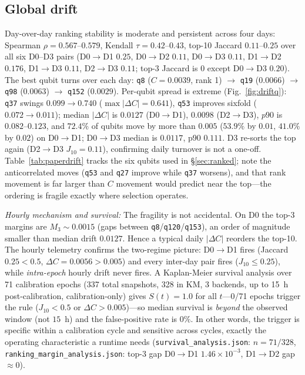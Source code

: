 \documentclass[journal,10pt,twocolumn]{IEEEtran}
\newcommand{\q}[1]{\texttt{q#1}}
\begin{document}
\subsection{Global drift}
\label{sec:driftglob}
Day-over-day ranking stability is moderate and persistent across four days: Spearman $\rho{=}0.567$--$0.579$,
Kendall $\tau{=}0.42$--$0.43$, top-10 Jaccard $0.11$--$0.25$ over all six D0--D3 pairs
(D0$\to$D1 $0.25$, D0$\to$D2 $0.11$, D0$\to$D3 $0.11$, D1$\to$D2 $0.176$, D1$\to$D3 $0.11$, D2$\to$D3 $0.11$; top-3 Jaccard is $0$ except D0$\to$D3 $0.20$).
The best qubit turns over each day:
\q{8} ($C{=}0.0039$, rank 1) $\to$ \q{19} ($0.0066$) $\to$ \q{98} ($0.0063$) $\to$ \q{152} ($0.0029$).
Per-qubit spread is extreme (Fig.~\ref{fig:driftq}): \q{37} swings $0.099{\to}0.740$ ($\max|\Delta C|{=}0.641$), \q{53} improves sixfold
($0.072{\to}0.011$); median $|\Delta C|$ is $0.0127$ (D0$\to$D1), $0.0098$ (D2$\to$D3), $p90$ is $0.082$--$0.123$, and $72.4\%$ of qubits move by more than
$0.005$ ($53.9\%$ by $0.01$, $41.0\%$ by $0.02$) on D0$\to$D1; D0$\to$D3 median is $0.0117$, p90 $0.111$. D3 re-sorts the top again (D2$\to$D3 $J_{10}{=}0.11$),
confirming daily turnover is not a one-off. Table~\ref{tab:paperdrift}
tracks the six qubits used in \S\ref{sec:ranked}; note the anticorrelated moves (\q{53} and \q{27} improve while
\q{37} worsens), and that rank movement is far larger than $C$ movement would predict near the top---the ordering
is fragile exactly where selection operates.

\emph{Hourly mechanism and survival:} The fragility is not accidental. On D0 the top-3 margins are $M_3\sim0.0015$ (gaps
between \q{8}/\q{120}/\q{153}), an order of magnitude smaller than median drift $0.0127$. Hence a typical daily
$|\Delta C|$ reorders the top-10. The hourly telemetry confirms the two-regime picture: D0$\to$D1 fires (Jaccard $0.25<0.5$, $\Delta C{=}0.0056>0.005$)
and every inter-day pair fires ($J_{10}\le0.25$), while \emph{intra-epoch} hourly drift never fires.
A Kaplan-Meier survival analysis over 71 calibration epochs (337 total snapshots, 328 in KM, 3 backends, up to 15~h post-calibration, calibration-only) gives
$S(t){=}1.0$ for all $t$---0/71 epochs trigger the rule ($J_{10}<0.5$ or $\Delta C>0.005$)---so median survival is \emph{beyond} the observed window (not $15$~h) and the false-positive rate is $0\%$.
In other words, the trigger is specific within a calibration cycle and sensitive across cycles, exactly the operating characteristic a runtime needs
(\texttt{survival\_analysis.json}: $n{=}71/328$, \texttt{ranking\_margin\_analysis.json}: top-3 gap D0$\to$D1 $1.46\times10^{-3}$, D1$\to$D2 gap $\approx0$).
\end{document}

